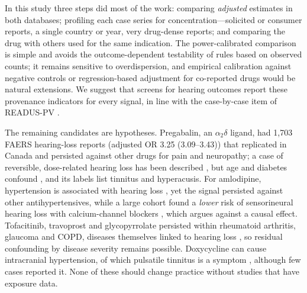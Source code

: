 In this study three steps did most of the work: comparing \emph{adjusted} estimates in both databases;
profiling each case series for concentration---solicited or consumer reports, a single country or year, very drug-dense
reports; and comparing the drug with others used for the same indication. The power-calibrated comparison is simple and avoids
the outcome-dependent testability of rules based on observed counts; it remains sensitive to overdispersion, and empirical
calibration against negative controls \cite{schuemie2014} or regression-based adjustment for co-reported drugs
\cite{caster2010} would be natural extensions. We suggest that screens for hearing outcomes report these provenance
indicators for every signal, in line with the case-by-case item of READUS-PV \cite{readuspv,readuspv_ee}.

The remaining candidates are hypotheses. Pregabalin, an $\alpha_2\delta$ ligand, had 1{,}703
FAERS hearing-loss reports (adjusted OR
3.25 (3.09--3.43))
that replicated in Canada and persisted against other drugs for pain and neuropathy; a case of reversible, dose-related hearing
loss has been described \cite{pregabalin_case}, but age and diabetes confound \cite{diabetes_hearing}, and its labels list
tinnitus and hyperacusis. For amlodipine, hypertension is associated with hearing loss \cite{htn_hearing}, yet the signal
persisted against other antihypertensives, while a large cohort found a \emph{lower} risk of sensorineural hearing loss with
calcium-channel blockers \cite{ccb_cohort}, which argues against a causal effect. Tofacitinib, travoprost and glycopyrrolate
persisted within rheumatoid arthritis, glaucoma and COPD, diseases themselves linked to hearing loss
\cite{ra_hearing,glaucoma_hearing,copd_hearing}, so residual confounding by disease severity remains possible. Doxycycline
can cause intracranial hypertension, of which pulsatile tinnitus is a symptom \cite{doxy_iih}, although few cases reported
it. None of these should change practice without studies that have exposure data.


